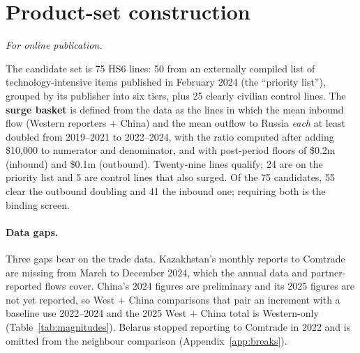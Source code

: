 \documentclass[12pt]{article}
\begin{document}
\section{Product-set construction}\label{app:products}
\emph{For online publication.}

\medskip
The candidate set is 75 HS6 lines: 50 from an externally compiled list of technology-intensive
items published in February 2024 (the ``priority list''), grouped by its publisher into six
tiers, plus 25 clearly civilian control lines. The \textbf{surge basket} is defined from the
data as the lines in which the mean inbound flow (Western reporters + China) and the mean
outflow to Russia \emph{each} at least doubled from 2019--2021 to 2022--2024, with the ratio
computed after adding \$10{,}000 to numerator and denominator, and with post-period floors of
\$0.2m (inbound) and \$0.1m (outbound). Twenty-nine lines qualify; 24 are on the priority list
and 5 are control lines that also surged. Of the 75 candidates, 55 clear the outbound doubling
and 41 the inbound one; requiring both is the binding screen.

\paragraph{Data gaps.} Three gaps bear on the trade data. Kazakhstan's monthly reports to Comtrade are missing from March to December 2024, which the annual data and partner-reported flows cover. China's 2024 figures are preliminary and its 2025 figures are not yet reported, so West + China comparisons that pair an increment with a baseline use 2022--2024 and the 2025 West + China total is Western-only (Table~\ref{tab:magnitudes}). Belarus stopped reporting to Comtrade in 2022 and is omitted from the neighbour comparison (Appendix~\ref{app:breaks}).
\end{document}
